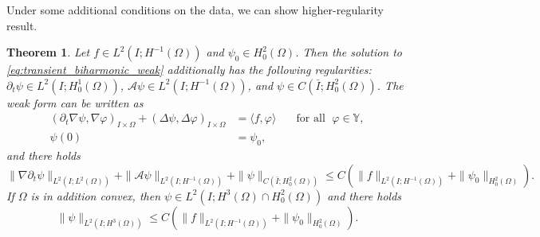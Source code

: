 \documentclass{m2an}
\newcommand{\1}{\mathds{1}}
\newcommand{\Om}{\Omega}
\newcommand{\IOprod}[1]{\left( #1 \right)_{I\times \Omega}}
\newcommand{\na}{\nabla}
\newcommand{\YY}{\mathbb{Y}}
\newtheorem{theorem}{Theorem}[section]
\theoremstyle{definition}
\begin{document}
Under some additional conditions on the data, we can show higher-regularity result.
\begin{theorem}\label{prop:weak_stability}
    Let $f \in L^2(I;H^{-1}(\Omega))$ and $\psi_0 \in H^2_0(\Omega)$.
    Then the solution to \eqref{eq:transient_biharmonic_weak} additionally has the following regularities:
    $\partial_t \psi\in L^2(I;H^1_0(\Om))$, $\mathcal A \psi \in L^2(I;H^{-1}(\Om))$,
    and $\psi \in C(\bar I;H^2_0(\Omega))$. The weak form can be written as 
\begin{equation}
    \begin{aligned}
	\IOprod{\partial_t \na \psi, \na \varphi}
        +\IOprod{\Delta \psi, \Delta \varphi}
        &= \langle f, \varphi \rangle \quad &\text{for all }\; \varphi\in \YY, \\
	\psi(0) &= \psi_0, &
    \end{aligned}
\end{equation}
        and there holds
	\[
	\|\na\partial_t \psi\|_{L^2(I;L^{2}(\Om))} 
  + \|\mathcal A \psi\|_{L^2(I;H^{-1}(\Om))} 
  + \|\psi\|_{C(\bar I;H^2_0(\Om))}
  \le C \left( \|f\|_{L^2(I;H^{-1}(\Omega))} + \|\psi_0\|_{H^2_0(\Omega)}\right).
	\]
	If $\Omega$ is in addition convex, then $\psi \in L^2(I;H^3(\Om)\cap H^2_0(\Om))$ and there holds
 	\[
 \|\psi\|_{L^2(I;H^3(\Om))} 
 \le C \left( \|f\|_{L^2(I;H^{-1}(\Omega))} + \|\psi_0\|_{H^2_0(\Omega)}\right).
 \]
  \end{theorem}
\end{document}
